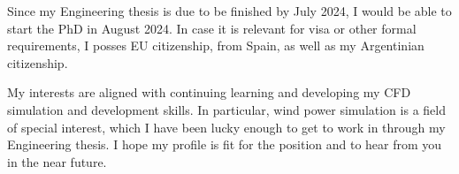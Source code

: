 \documentclass{letter}
\newcommand{\thesisname}{Parametric analysis of actuator disks models to simulate wind farms}
\begin{document}
\begin{letter}{}
Since my Engineering thesis is due to be finished by July 2024, I would be able to start the PhD in August 2024.
  In case it is relevant for visa or other formal requirements, I posses EU citizenship, from Spain, as well as my Argentinian citizenship.

  My interests are aligned with continuing learning and developing my CFD simulation and development skills. 
  In particular, wind power simulation is a field of special interest, which I have been lucky enough to get to work in through my Engineering thesis. 
  I hope my profile is fit for the position and to hear from you in the near future.




\end{letter}
\end{document}
